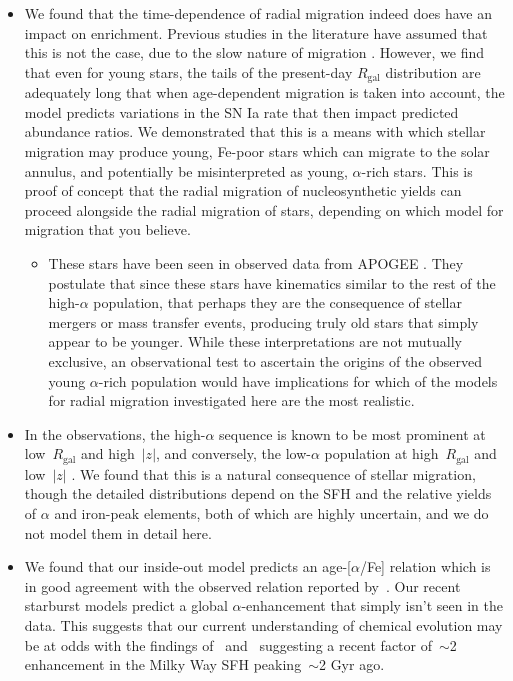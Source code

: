 \documentclass[a4paper, fleqn, usenatbib, useAMS]{mnras}
\begin{document}
\begin{itemize}
	\item We found that the time-dependence of radial migration indeed does 
	have an impact on enrichment. Previous studies in the literature have 
	assumed that this is not the case, due to the slow nature of migration 
	\citep[e.g.][]{Minchev2013}. However, we find that even for young stars, 
	the tails of the present-day $R_\text{gal}$ distribution are adequately 
	long that when age-dependent migration is taken into account, the model 
	predicts variations in the SN Ia rate that then impact predicted abundance 
	ratios. We demonstrated that this is a means with which stellar migration 
	may produce young, Fe-poor stars which can migrate to the solar annulus, 
	and potentially be misinterpreted as young, $\alpha$-rich stars. This is 
	proof of concept that the radial migration of nucleosynthetic yields can 
	proceed alongside the radial migration of stars, depending on which model 
	for migration that you believe. 
	\begin{itemize} 
		\item These stars have been seen in observed data from APOGEE 
		\citep[e.g.][]{SilvaAguirre2018}. They postulate that since these stars 
		have kinematics similar to the rest of the high-$\alpha$ population, 
		that perhaps they are the consequence of stellar mergers or mass 
		transfer events, producing truly old stars that simply appear to be 
		younger. While these interpretations are not mutually exclusive, an 
		observational test to ascertain the origins of the observed young 
		$\alpha$-rich population would have implications for which of the 
		models for radial migration investigated here are the most realistic. 
	\end{itemize} 

	\item In the observations, the high-$\alpha$ sequence is known to be most 
	prominent at low~$R_\text{gal}$ and high~$\left|z\right|$, and conversely, 
	the low-$\alpha$ population at high~$R_\text{gal}$ and low~$\left|z\right|$ 
	\citep[e.g.][]{Hayden2015}.  We found that this is a natural consequence of 
	stellar migration, though the detailed distributions depend on the SFH and 
	the relative yields of $\alpha$ and iron-peak elements, both of which are 
	highly uncertain, and we do not model them in detail here. 

	\item We found that our inside-out model predicts an age-[$\alpha$/Fe] 
	relation which is in good agreement with the observed relation reported 
	by~\citet{Feuillet2019}. Our recent starburst models predict a global 
	$\alpha$-enhancement that simply isn't seen in the data. This suggests 
	that our current understanding of chemical evolution may be at odds with 
	the findings of~\citet{Mor2019} and~\citet{Isern2019} suggesting a recent 
	factor of~$\sim$2 enhancement in the Milky Way SFH peaking~$\sim$2 Gyr ago. 


\end{itemize}
\end{document}
